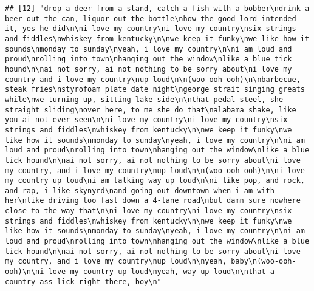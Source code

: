 \documentclass[]{article}
\begin{document}
\begin{verbatim}
## [12] "drop a deer from a stand, catch a fish with a bobber\ndrink a beer out the can, liquor out the bottle\nhow the good lord intended it, yes he did\n\ni love my country\ni love my country\nsix strings and fiddles\nwhiskey from kentucky\n\nwe keep it funky\nwe like how it sounds\nmonday to sunday\nyeah, i love my country\n\ni am loud and proud\nrolling into town\nhanging out the window\nlike a blue tick hound\n\nai not sorry, ai not nothing to be sorry about\ni love my country and i love my country\nup loud\n\n(woo-ooh-ooh)\n\nbarbecue, steak fries\nstyrofoam plate date night\ngeorge strait singing greats while\nwe turning up, sitting lake-side\n\nthat pedal steel, she straight sliding\nover here, to me she do that\nalabama shake, like you ai not ever seen\n\ni love my country\ni love my country\nsix strings and fiddles\nwhiskey from kentucky\n\nwe keep it funky\nwe like how it sounds\nmonday to sunday\nyeah, i love my country\n\ni am loud and proud\nrolling into town\nhanging out the window\nlike a blue tick hound\n\nai not sorry, ai not nothing to be sorry about\ni love my country, and i love my country\nup loud\n\n(woo-ooh-ooh)\n\ni love my country up loud\ni am talking way up loud\n\ni like pop, and rock, and rap, i like skynyrd\nand going out downtown when i am with her\nlike driving too fast down a 4-lane road\nbut damn sure nowhere close to the way that\n\ni love my country\ni love my country\nsix strings and fiddles\nwhiskey from kentucky\n\nwe keep it funky\nwe like how it sounds\nmonday to sunday\nyeah, i love my country\n\ni am loud and proud\nrolling into town\nhanging out the window\nlike a blue tick hound\n\nai not sorry, ai not nothing to be sorry about\ni love my country, and i love my country\nup loud\n\nyeah, baby\n(woo-ooh-ooh)\n\ni love my country up loud\nyeah, way up loud\n\nthat a country-ass lick right there, boy\n"                                                                                                                                                                                                                                                                                                                                                                                                                                                                                                                                                                                                                                                                                                                                                                                                                                                                                                                                                                                                                                       

\end{verbatim}
\end{document}
